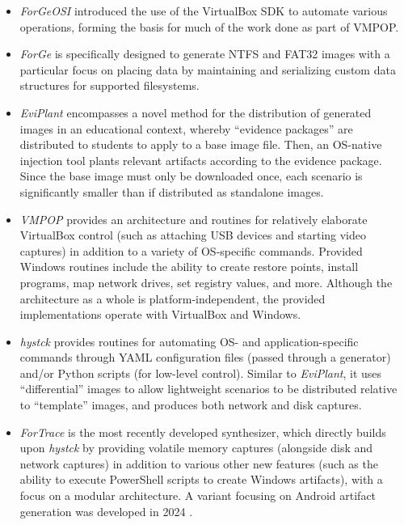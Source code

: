 \begin{itemize}
\tightlist
\item
  \emph{ForGeOSI} \cite{maxfraggMaxfraggForGeOSI2023} introduced the
  use of the VirtualBox SDK to automate various operations, forming the
  basis for much of the work done as part of VMPOP.
\item
  \emph{ForGe} \cite{vistiAutomaticCreationComputer2015} is
  specifically designed to generate NTFS and FAT32 images with a
  particular focus on placing data by maintaining and serializing custom
  data structures for supported filesystems.
\item
  \emph{EviPlant} \cite{scanlonEviPlantEfficientDigital2017}
  encompasses a novel method for the distribution of generated images in
  an educational context, whereby ``evidence packages'' are distributed
  to students to apply to a base image file. Then, an OS-native
  injection tool plants relevant artifacts according to the evidence
  package. Since the base image must only be downloaded once, each
  scenario is significantly smaller than if distributed as standalone
  images.
\item
  \emph{VMPOP} \cite{parkTREDEVMPOPCultivating2018} provides an
  architecture and routines for relatively elaborate VirtualBox control
  (such as attaching USB devices and starting video captures) in
  addition to a variety of OS-specific commands. Provided Windows
  routines include the ability to create restore points, install
  programs, map network drives, set registry values, and more. Although
  the architecture as a whole is platform-independent, the provided
  implementations operate with VirtualBox and Windows.
\item
  \emph{hystck} \cite{gobelNovelApproachGenerating2020} provides
  routines for automating OS- and application-specific commands through
  YAML configuration files (passed through a generator) and/or Python
  scripts (for low-level control). Similar to \emph{EviPlant}, it uses
  ``differential'' images to allow lightweight scenarios to be
  distributed relative to ``template'' images, and produces both network
  and disk captures.
\item
  \emph{ForTrace} \cite{gobelForTraceHolisticForensic2022} is the
  most recently developed synthesizer, which directly builds upon
  \emph{hystck} by providing volatile memory captures (alongside disk
  and network captures) in addition to various other new features (such
  as the ability to execute PowerShell scripts to create Windows
  artifacts), with a focus on a modular architecture. A variant focusing
  on Android artifact generation was developed in 2024
  \cite{demmelDataSynthesisGoing2024}.
\end{itemize}

